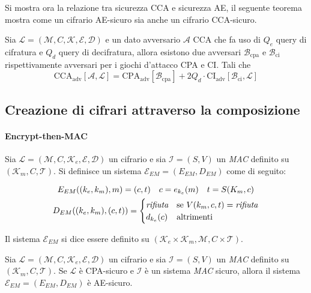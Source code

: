 Si mostra ora la relazione tra sicurezza CCA e sicurezza AE, il seguente teorema mostra come un cifrario AE-sicuro sia anche un cifrario CCA-sicuro.
\begin{theorem}
    Sia $\mathcal{L} = (\mathcal{M},C,\mathcal{K},\mathcal{E},\mathcal{D})$ e un dato avversario $\mathcal{A}$ CCA che fa uso di $Q_e$ query di cifratura e $Q_d$ query di decifratura, allora esistono due avversari $\mathcal{B}_{\text{cpa}}$ e $\mathcal{B}_{\text{ci}}$ rispettivamente avversari per i giochi d'attacco CPA e CI. Tali che 
    \[
        \text{CCA}_\text{adv}[\mathcal{A},\mathcal{L}] = \text{CPA}_\text{adv}[\mathcal{B}_{\text{cpa}}] + 2Q_{d} \cdot \text{CI}_\text{adv}[\mathcal{B}_{\text{ci}},\mathcal{L}]
    \]
\end{theorem}

\newpage
\subsection{Creazione di cifrari attraverso la composizione}
\paragraph{Encrypt-then-MAC}
Sia $\mathcal{L} = (\mathcal{M},C,\mathcal{K}_e,\mathcal{E},\mathcal{D})$ un cifrario e sia $\mathcal{I} = (S,V)$ un \emph{MAC} definito su $(\mathcal{K}_m,C,\mathcal{T})$. Si definisce un sistema $\mathcal{E}_{EM} = (E_{EM}, D_{EM})$ come di seguito:

\begin{gather*}
    E_{EM}((k_e,k_m),m) = (c,t) \quad c = e_{k_e}(m) \quad t = S(K_m,c)\\
    D_{EM}( (k_e,k_m), (c,t)) = 
    \begin{cases}
        \emph{rifiuta} & \text{se $V(k_m,c,t) = \emph{rifiuta}$}\\
        d_{k_e}(c) & \text{altrimenti}
    \end{cases}
\end{gather*}

Il sistema $\mathcal{E}_{EM}$ si dice essere definito su $(\mathcal{K}_e \times \mathcal{K}_m, \mathcal{M}, C \times \mathcal{T})$.

\begin{theorem}
    Sia $\mathcal{L} = (\mathcal{M},C,\mathcal{K}_e,\mathcal{E},\mathcal{D})$ un cifrario e sia $\mathcal{I} = (S,V)$ un \emph{MAC} definito su $(\mathcal{K}_m,C,\mathcal{T})$. Se $\mathcal{L}$ è CPA-sicuro e $\mathcal{I}$ è un sistema \emph{MAC} sicuro, allora il sistema $\mathcal{E}_{EM} = (E_{EM}, D_{EM})$ è AE-sicuro.
\end{theorem}

